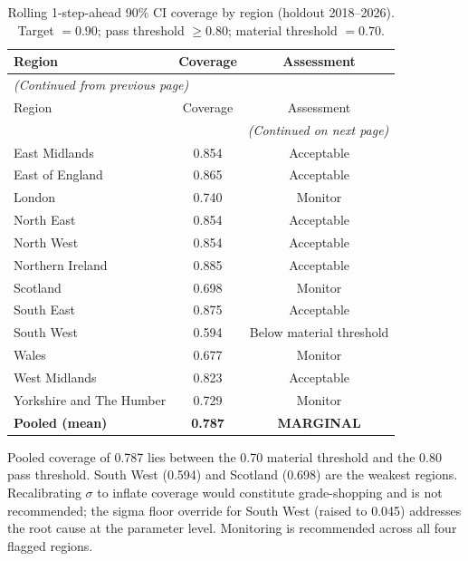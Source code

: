 \documentclass[11pt,a4paper]{article}
\theoremstyle{plain}
\theoremstyle{definition}
\newcommand{\sig}{\sigma}
\begin{document}
\begin{longtable}{lcc}
\caption{Rolling 1-step-ahead 90\% CI coverage by region
(holdout 2018--2026).
Target $= 0.90$;
pass threshold $\geq 0.80$;
material threshold $= 0.70$.}\label{tab:ci}\\
\toprule
Region & Coverage & Assessment \\
\midrule
\endfirsthead
\multicolumn{3}{l}{\small\itshape(Continued from previous page)}\\
\toprule
Region & Coverage & Assessment \\
\midrule
\endhead
\midrule
\multicolumn{3}{r}{\small\itshape(Continued on next page)}\\
\endfoot
\bottomrule
\endlastfoot
East Midlands             & 0.854 & Acceptable \\
East of England           & 0.865 & Acceptable \\
London                    & 0.740 & Monitor \\
North East                & 0.854 & Acceptable \\
North West                & 0.854 & Acceptable \\
Northern Ireland          & 0.885 & Acceptable \\
Scotland                  & 0.698 & Monitor \\
South East                & 0.875 & Acceptable \\
South West                & 0.594 & Below material threshold \\
Wales                     & 0.677 & Monitor \\
West Midlands             & 0.823 & Acceptable \\
Yorkshire and The Humber  & 0.729 & Monitor \\
\midrule
\textbf{Pooled (mean)}    & \textbf{0.787} & \textbf{MARGINAL} \\
\end{longtable}

\begin{govbox}
Pooled coverage of 0.787 lies between the 0.70 material threshold and
the 0.80 pass threshold.  South West (0.594) and Scotland (0.698) are
the weakest regions.  Recalibrating $\sig$ to inflate coverage would
constitute grade-shopping and is not recommended; the sigma floor override
for South West (raised to 0.045) addresses the root cause at the parameter
level.  Monitoring is recommended across all four flagged regions.
\end{govbox}
\end{document}
